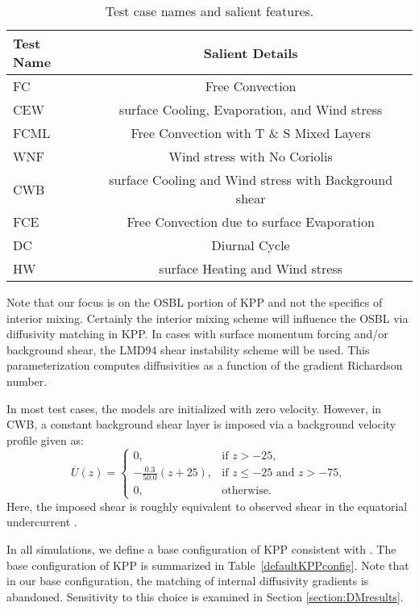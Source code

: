 \documentclass[preprint,12pt,authoryear]{agujournal}
\begin{document}
\begin{table}
	\centering
	\def\arraystretch{1.5}
	\begin{tabular}{ l  c }
		\hline
		Test Name & Salient Details \\
		\hline
		FC & Free Convection \\
		CEW & surface Cooling, Evaporation, and Wind stress  \\
		FCML & Free Convection with T \& S Mixed Layers  \\
        WNF & Wind stress with No Coriolis   \\
        CWB & surface Cooling and Wind stress with Background shear \\
        FCE & Free Convection due to surface Evaporation \\
        DC & Diurnal Cycle  \\
        HW & surface Heating and Wind stress  \\
        \hline
	\end{tabular}
	\caption{Test case names and salient features.} 
	\label{testNames}
\end{table}

Note that our focus is on the OSBL portion of KPP and not the specifics of interior mixing.  Certainly the interior mixing scheme will influence the OSBL via diffusivity matching in KPP.  In cases with surface momentum forcing and/or background shear, the LMD94 shear instability scheme will be used.  This parameterization computes diffusivities as a function of the gradient Richardson number.

In most test cases, the models are initialized with zero velocity. However, in CWB, a constant background shear layer is imposed via a background velocity profile given as:
\begin{equation}
\label{eq:background_shear}
 \overline{U}(z) =\begin{cases}
    0, & \text{if $z>-25$},\\
    -\frac{0.3}{50.0}(z+25), & \text{if $z\leq-25$ and $z > -75$}, \\
    0, & \text{otherwise}.
  \end{cases}
\end{equation}
Here, the imposed shear is roughly equivalent to observed shear in the equatorial undercurrent \citep{johnson2002direct}.

In all simulations, we define a base configuration of KPP consistent with \cite{Danabasoglu2006}.  The base configuration of KPP is summarized in Table~\ref{defaultKPPconfig}.  Note that in our base configuration, the matching of internal diffusivity gradients is abandoned.  Sensitivity to this choice is examined in Section \ref{section:DMresults}. 
\end{document}
